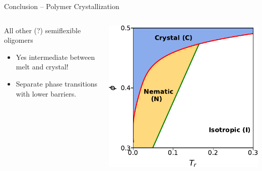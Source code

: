 \documentclass[aspectratio=169]{beamer}
\begin{document}
\begin{frame}[c]{Conclusion -- Polymer Crystallization}
\begin{columns}[T, onlytextwidth]

    \vspace{-0.6\baselineskip}

    \centering

    \centering
    \begin{block}{All other (?) semiflexible oligomers}
      \begin{itemize}
      \item Yes intermediate between melt and crystal!
      \item Separate phase transitions with lower barriers.
    \end{itemize}
    \end{block}

    \vspace{8pt}
    \includegraphics[scale=0.6]{../figures/fig-step_vs_harm_phase_diags/from_harm/fig-phase_diag.pdf}


  \end{columns}

\end{frame}
\end{document}
